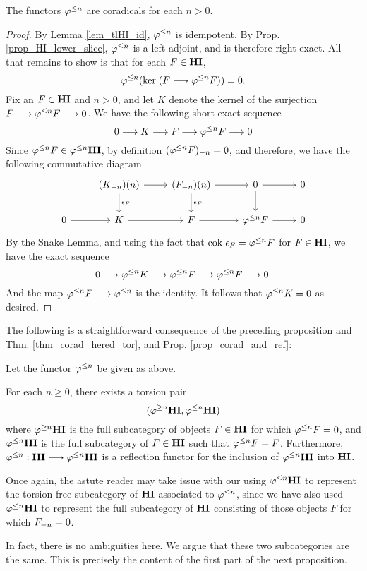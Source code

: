 \begin{prop}
The functors $\tlHI{n}$ are coradicals for each $n > 0$.
\end{prop}
\begin{proof}
By Lemma \ref{lem_tlHI_id}, $\tlHI{n}$ is idempotent. By Prop. 
\ref{prop_HI_lower_slice}, $\tlHI{n}$ is a left adjoint, and
is therefore right exact. All that remains to show is that for
each $F \in \HI$,
\[
\tlHI{n}(\ker (F \to \tlHI{n} F)) = 0.
\]
Fix an $F \in \HI$ and $n > 0$, and let $K$ denote the kernel of 
the surjection $F \to \tlHI{n}F \to 0$. We have the following
short exact sequence 
\[
0 \to K \to F \to \tlHI{n} F \to 0
\]
Since $\tlHI{n} F \in \tlHI{n}\HI$, by definition 
$\RHI[n]{(\tlHI{n} F)} = 0$, and therefore, we have the following
commutative diagram
\[
\begin{tikzcd}
{} &\LHI[n]{(\RHI[n]{K})} \arrow{d}{\cuHI_F} \arrow{r}
   &\LHI[n]{(\RHI[n]{F})} \arrow{d}{\cuHI_F} \arrow{r}
   &0 \arrow{d} \arrow{r}
   &0 \\
0 \arrow{r} &
  K \arrow{r}&
  F \arrow{r}&
  \tlHI{n}F \arrow{r}&
  0
\end{tikzcd}
\]
By the Snake Lemma, and using the fact that $\cok \cuHI_F = 
\tlHI{n} F$ for $F \in \HI$, we have the exact sequence
\[
0 \to \tlHI{n}K \to \tlHI{n}F \to \tlHI{n} F \to 0.
\]
And the map $\tlHI{n}F \to \tlHI{n}$ is the identity. It follows 
that $\tlHI{n} K = 0$ as desired.
\end{proof}

The following is a straightforward consequence of the preceding 
proposition and Thm. \ref{thm_corad_hered_tor}, and Prop.
\ref{prop_corad_and_ref}:

\begin{cor}
Let the functor $\tlHI{n}$ be given as above.

For each $n \geq 0$, there exists a torsion pair
\[
(\tgHI{n}\HI, \tlHI{n}\HI)
\]
where $\tgHI{n}\HI$ is the full subcategory of objects $F \in \HI$
for which $\tlHI{n} F = 0$, and $\tlHI{n}\HI$ is the full 
subcategory of $F \in \HI$ such that $\tlHI{n} F = F$. Furthermore, 
$\tlHI{n} : \HI \to \tlHI{n}\HI$ is a reflection functor for the
inclusion of $\tlHI{n} \HI$ into $\HI$.
\end{cor}

\begin{rmk}
Once again, the astute reader may take issue with our using 
$\tlHI{n} \HI$ to represent the torsion-free subcategory of $\HI$ 
associated to $\tlHI{n}$, since we have also used $\tlHI{n} \HI$ 
to represent the full subcategory of $\HI$ consisting of those 
objects $F$ for which $\RHI[n]{F} = 0$.

In fact, there is no ambiguities here. We argue that these two 
subcategories are the same. This is precisely the content of the
first part of the next proposition.
\end{rmk}

